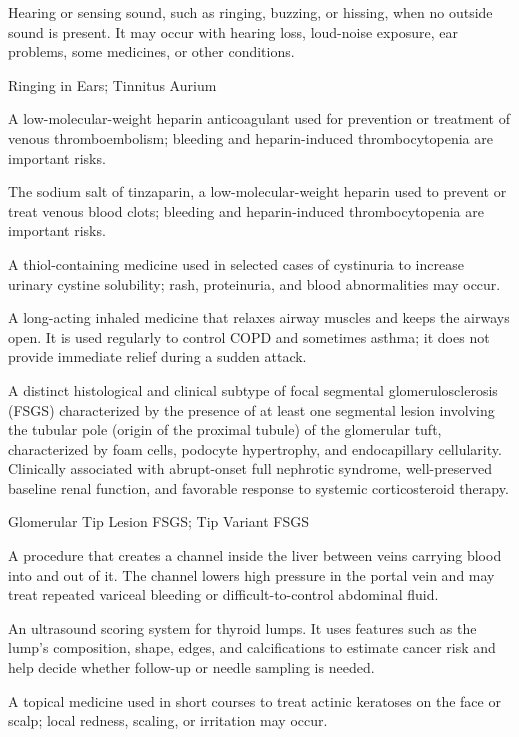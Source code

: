 Hearing or sensing sound, such as ringing, buzzing, or hissing, when no outside sound is present. It may occur with hearing loss, loud-noise exposure, ear problems, some medicines, or other conditions.

\synonyms
Ringing in Ears; Tinnitus Aurium

 A low-molecular-weight heparin anticoagulant used for prevention or treatment of venous thromboembolism; bleeding and heparin-induced thrombocytopenia are important risks.

 The sodium salt of tinzaparin, a low-molecular-weight heparin used to prevent or treat venous blood clots; bleeding and heparin-induced thrombocytopenia are important risks.

 A thiol-containing medicine used in selected cases of cystinuria to increase urinary cystine solubility; rash, proteinuria, and blood abnormalities may occur.

 A long-acting inhaled medicine that relaxes airway muscles and keeps the airways open. It is used regularly to control COPD and sometimes asthma; it does not provide immediate relief during a sudden attack.

 A distinct histological and clinical subtype of focal segmental glomerulosclerosis (FSGS) characterized by the presence of at least one segmental lesion involving the tubular pole (origin of the proximal tubule) of the glomerular tuft, characterized by foam cells, podocyte hypertrophy, and endocapillary cellularity. Clinically associated with abrupt-onset full nephrotic syndrome, well-preserved baseline renal function, and favorable response to systemic corticosteroid therapy.

\synonyms
Glomerular Tip Lesion FSGS; Tip Variant FSGS

 A procedure that creates a channel inside the liver between veins carrying blood into and out of it. The channel lowers high pressure in the portal vein and may treat repeated variceal bleeding or difficult-to-control abdominal fluid.

 An ultrasound scoring system for thyroid lumps. It uses features such as the lump’s composition, shape, edges, and calcifications to estimate cancer risk and help decide whether follow-up or needle sampling is needed.

 A topical medicine used in short courses to treat actinic keratoses on the face or scalp; local redness, scaling, or irritation may occur.

